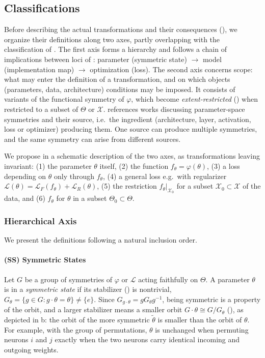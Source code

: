 \documentclass[mathematics,review,submit,moreauthors]{Definitions/mdpi}
\begin{document}
\subsection{Classifications}\label{sec:classifications-param-space-symmetries}
Before describing the actual transformations and their consequences (), we organize their definitions along two axes, partly overlapping with the classification of \citet{zhao2025}.
The first axis forms a hierarchy and follows a chain of implications between loci of : parameter (symmetric state) $\to$ model (implementation map) $\to$ optimization (loss).
The second axis concerns scope: what may enter the definition of a transformation, and on which objects (parameters, data, architecture) conditions may be imposed.
It consists of variants of the functional symmetry of $\varphi$, which become \emph{extent-restricted} () when restricted to a subset of $\Theta$ or $\mathcal X$.
 references works discussing parameter-space symmetries and their source, i.e.\ the ingredient (architecture, layer, activation, loss or optimizer) producing them.
One source can produce multiple symmetries, and the same symmetry can arise from different sources.

We propose in  a schematic description of the two axes, as transformations leaving invariant: (1) the parameter $\theta$ itself, (2) the function $f_\theta=\varphi(\theta)$, (3) a loss depending on $\theta$ only through $f_\theta$, (4) a general loss e.g.\ with regularizer $\mathcal{L}(\theta)=\mathcal{L}_F(f_\theta)+\mathcal{L}_R(\theta)$, (5) the restriction $f_\theta|_{\mathcal{X}_0}$ for a subset $\mathcal{X}_0\subset\mathcal{X}$ of the data, and (6) $f_\theta$ for $\theta$ in a subset $\Theta_0\subset\Theta$.

\subsubsection{Hierarchical Axis}\label{sec:hierarchy-param-space-symmetries}

We present the definitions following a natural inclusion order.

\paragraph{(SS) Symmetric States}
Let $G$ be a group of symmetries of $\varphi$ or $\mathcal{L}$ acting faithfully on $\Theta$.
A parameter $\theta$ is in a \emph{symmetric state} \citep{simsek2021,ziyin2025} if its stabilizer () is nontrivial, $G_\theta=\{g\in G : g\cdot\theta=\theta\}\neq\{e\}$.
Since $G_{g\cdot\theta}=gG_\theta g^{-1}$, being symmetric is a property of the orbit, and a larger stabilizer means a smaller orbit $G\cdot\theta\cong G/G_\theta$ (), as depicted in  b: the orbit of the more symmetric $\tilde \theta$ is smaller than the orbit of $\theta$.
For example, with the group of permutations, $\theta$ is unchanged when permuting neurons $i$ and $j$ exactly when the two neurons carry identical incoming and outgoing weights.
\end{document}
